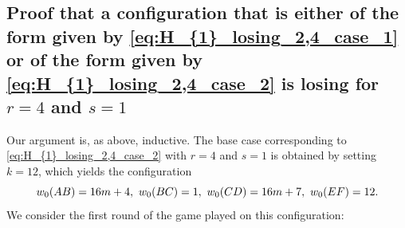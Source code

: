 \documentclass[11pt,reqno]{amsart}
\theoremstyle{definition}
\theoremstyle{definition}
\begin{document}
\subsection{Proof that a configuration that is either of the form given by \eqref{eq:H_{1}_losing_2,4_case_1} or of the form given by \eqref{eq:H_{1}_losing_2,4_case_2} is losing for $r=4$ and $s=1$}\label{subsec:H_{1}_losing_4_1,2_proof}
Our argument is, as above, inductive. The base case corresponding to \eqref{eq:H_{1}_losing_2,4_case_2} with $r=4$ and $s=1$ is obtained by setting $k=12$, which yields the configuration
\begin{equation}
w_{0}(AB)=16m+4,\ w_{0}(BC)=1,\ w_{0}(CD)=16m+7,\ w_{0}(EF)=12.\label{eq:H_{1}_losing_4_1_base_case}
\end{equation}
We consider the first round of the game played on this configuration:
\end{document}
